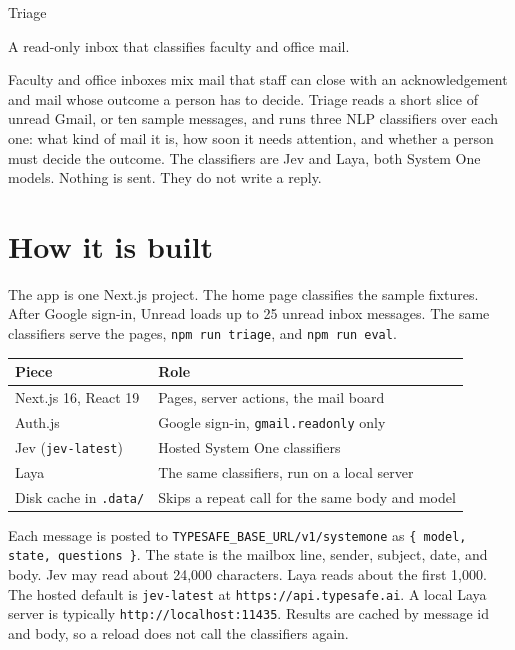 \documentclass[11pt,a4paper]{article}
\begin{document}
\color{ink}

{\sffamily\Huge Triage\par}
\vspace{0.2em}
{\large A read-only inbox that classifies faculty and office mail.\par}
\vspace{0.55em}

Faculty and office inboxes mix mail that staff can close with an acknowledgement and mail whose outcome a person has to decide. Triage reads a short slice of unread Gmail, or ten sample messages, and runs three NLP classifiers over each one: what kind of mail it is, how soon it needs attention, and whether a person must decide the outcome. The classifiers are Jev and Laya, both System One models. Nothing is sent. They do not write a reply.

\section{How it is built}

The app is one Next.js project. The home page classifies the sample fixtures. After Google sign-in, Unread loads up to 25 unread inbox messages. The same classifiers serve the pages, \texttt{npm run triage}, and \texttt{npm run eval}.

\begin{center}
\small
\begin{tabular}{@{}ll@{}}
\toprule
\textbf{Piece} & \textbf{Role} \\
\midrule
Next.js 16, React 19 & Pages, server actions, the mail board \\
Auth.js & Google sign-in, \texttt{gmail.readonly} only \\
Jev (\texttt{jev-latest}) & Hosted System One classifiers \\
Laya & The same classifiers, run on a local server \\
Disk cache in \texttt{.data/} & Skips a repeat call for the same body and model \\
\bottomrule
\end{tabular}
\end{center}

Each message is posted to \texttt{TYPESAFE\_BASE\_URL/v1/systemone} as \texttt{\{ model, state, questions \}}. The state is the mailbox line, sender, subject, date, and body. Jev may read about 24{,}000 characters. Laya reads about the first 1{,}000. The hosted default is \texttt{jev-latest} at \texttt{https://api.typesafe.ai}. A local Laya server is typically \texttt{http://localhost:11435}. Results are cached by message id and body, so a reload does not call the classifiers again.
\end{document}
